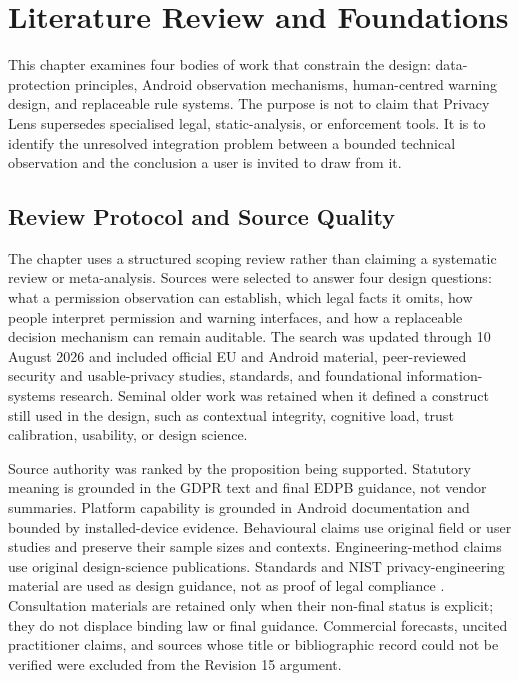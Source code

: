 \section{Literature Review and Foundations}

This chapter examines four bodies of work that constrain the design: data-protection principles, Android observation mechanisms, human-centred warning design, and replaceable rule systems. The purpose is not to claim that Privacy Lens supersedes specialised legal, static-analysis, or enforcement tools. It is to identify the unresolved integration problem between a bounded technical observation and the conclusion a user is invited to draw from it.

\subsection{Review Protocol and Source Quality}

The chapter uses a structured scoping review rather than claiming a systematic review or meta-analysis. Sources were selected to answer four design questions: what a permission observation can establish, which legal facts it omits, how people interpret permission and warning interfaces, and how a replaceable decision mechanism can remain auditable. The search was updated through 10 August 2026 and included official EU and Android material, peer-reviewed security and usable-privacy studies, standards, and foundational information-systems research. Seminal older work was retained when it defined a construct still used in the design, such as contextual integrity, cognitive load, trust calibration, usability, or design science.

Source authority was ranked by the proposition being supported. Statutory meaning is grounded in the GDPR text and final EDPB guidance, not vendor summaries. Platform capability is grounded in Android documentation and bounded by installed-device evidence. Behavioural claims use original field or user studies and preserve their sample sizes and contexts. Engineering-method claims use original design-science publications. Standards and NIST privacy-engineering material are used as design guidance, not as proof of legal compliance \cite{nist8062,nistprivacy2020}. Consultation materials are retained only when their non-final status is explicit; they do not displace binding law or final guidance. Commercial forecasts, uncited practitioner claims, and sources whose title or bibliographic record could not be verified were excluded from the Revision 15 argument.


